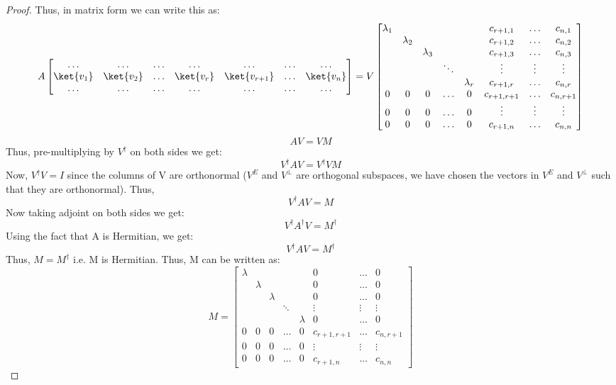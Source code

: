 \documentclass[12pt, oneside]{book}
\theoremstyle{definition}
\theoremstyle{definition}
\theoremstyle{remark}
\begin{document}
\begin{proof}
    Thus, in matrix form we can write this as:
    \[A\begin{bmatrix} \ldots & \ldots & \ldots & \ldots & \ldots & \ldots & \ldots \\ \ket{v_1} & \ket{v_2} & \ldots & \ket{v_r} & \ket{v_{r+1}} & \ldots & \ket{v_n} \\ \ldots & \ldots & \ldots & \ldots & \ldots  & \ldots & \ldots \end{bmatrix} = V\begin{bmatrix} \lambda_1 & & & & & c_{r+1,1} & \ldots & c_{n,1} \\ & \lambda_2 & & & & c_{r+1,2} & \ldots & c_{n,2} \\ & & \lambda_3 & & & c_{r+1,3} & \ldots & c_{n,3} \\ & & & \ddots & & \vdots & \vdots & \vdots \\ & & & & \lambda_r & c_{r+1,r} & \ldots & c_{n,r} \\ 0 & 0 & 0 & \ldots & 0 & c_{r+1,r+1} & \ldots & c_{n,r+1} \\ 0 & 0 & 0 & \ldots & 0 & \vdots & \vdots & \vdots \\ 0 & 0 & 0 & \ldots & 0 & c_{r+1,n} & \ldots & c_{n,n} \end{bmatrix}\] 
    \[AV=VM\]
    Thus, pre-multiplying by $V^{\dagger}$ on both sides we get:
    \[V^{\dagger}AV=V^{\dagger}VM \]
    Now, $V^{\dagger}V=I$ since the columns of V are orthonormal ($V^E$ and $V^{\perp}$ are orthogonal subspaces, we have chosen the vectors in $V^E$ and $V^{\perp}$ such that they are orthonormal). Thus,
    \[V^{\dagger}AV=M \]
    Now taking adjoint on both sides we get:
    \[V^{\dagger}A^{\dagger}V=M^{\dagger} \]
    Using the fact that A is Hermitian, we get:
    \[V^{\dagger}AV=M^{\dagger} \]
    Thus, $M=M^{\dagger}$ i.e. M is Hermitian. Thus, M can be written as:
    \[ M=\begin{bmatrix} \lambda & & & & & 0 & \ldots & 0 \\ & \lambda & & & & 0 & \ldots & 0 \\ & & \lambda & & & 0 & \ldots & 0 \\ & & & \ddots & & \vdots & \vdots & \vdots \\ & & & & \lambda & 0 & \ldots & 0 \\ 0 & 0 & 0 & \ldots & 0 & c_{r+1,r+1} & \ldots & c_{n,r+1} \\ 0 & 0 & 0 & \ldots & 0 & \vdots & \vdots & \vdots \\ 0 & 0 & 0 & \ldots & 0 & c_{r+1,n} & \ldots & c_{n,n} \end{bmatrix}\]

\end{proof}
\end{document}
